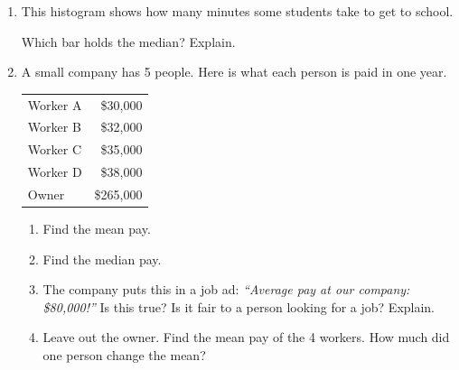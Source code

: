 \documentclass[11pt]{article}
\newif\ifkey
\newcommand{\ans}[1]{\ifkey\leavevmode{\color{red!75!black}#1}\fi}
\begin{document}
\begin{enumerate}[leftmargin=1.5em,itemsep=1em]
\newpage
\item This histogram shows how many minutes some students take to get to school.

\begin{center}
\end{center}
Which bar holds the median? Explain.

\ans{10 to 20 minutes. There are $5 + 8 + 6 + 3 + 2 = 24$ values, so the median is between the 12th and 13th values. 5 values are below 10. $5 + 8 = 13$ values are below 20. So the 12th and 13th values are both in the 10 to 20 bar.}
\vspace{\ifkey 1em\else 6em\fi}

\item A small company has 5 people. Here is what each person is paid in one year.
\begin{center}
\renewcommand{\arraystretch}{1.3}
\begin{tabular}{|l|r|} \hline
Worker A & \$30,000 \\ Worker B & \$32,000 \\ Worker C & \$35,000 \\ Worker D & \$38,000 \\ Owner & \$265,000 \\ \hline
\end{tabular}
\end{center}
\begin{enumerate}[itemsep=\ifkey 1em\else 4em\fi]
  \item Find the mean pay. \ans{\quad $400{,}000 \div 5 = \$80{,}000$}
  \item Find the median pay. \ans{\quad \$35,000}
  \item The company puts this in a job ad: \textit{``Average pay at our company: \$80,000!''}
  Is this true? Is it fair to a person looking for a job? Explain.

  \ans{True, but not fair. 4 of the 5 people earn less than \$40,000. The owner's pay pulls the mean up. The median (\$35,000) is a better description of a typical worker.}
  \item Leave out the owner. Find the mean pay of the 4 workers. How much did one person change the mean?


\end{enumerate}
\end{enumerate}
\end{document}
